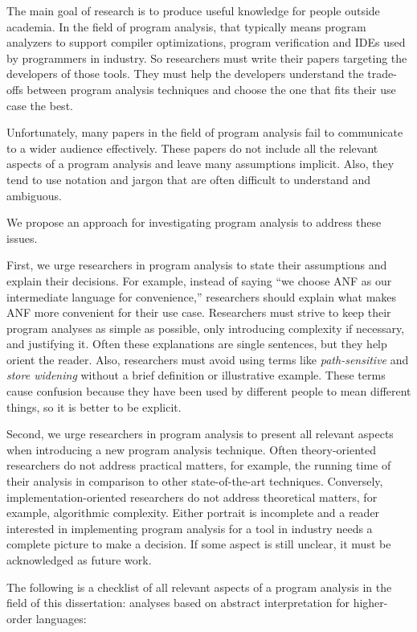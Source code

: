 \documentclass[12pt, oneside]{book}
\begin{document}
The main goal of research is to produce useful knowledge for people outside academia. In the field of program analysis, that typically means program analyzers to support compiler optimizations, program verification and IDEs used by programmers in industry. So researchers must write their papers targeting the developers of those tools. They must help the developers understand the trade-offs between program analysis techniques and choose the one that fits their use case the best.

Unfortunately, many papers in the field of program analysis fail to communicate to a wider audience effectively. These papers do not include all the relevant aspects of a program analysis and leave many assumptions implicit. Also, they tend to use notation and jargon that are often difficult to understand and ambiguous.

We propose an approach for investigating program analysis to address these issues.

First, we urge researchers in program analysis to state their assumptions and explain their decisions. For example, instead of saying “we choose ANF as our intermediate language for convenience,” researchers should explain what makes ANF more convenient for their use case. Researchers must strive to keep their program analyses as simple as possible, only introducing complexity if necessary, and justifying it. Often these explanations are single sentences, but they help orient the reader. Also, researchers must avoid using terms like \emph{path-sensitive} and \emph{store widening} without a brief definition or illustrative example. These terms cause confusion because they have been used by different people to mean different things, so it is better to be explicit.

Second, we urge researchers in program analysis to present all relevant aspects when introducing a new program analysis technique. Often theory-oriented researchers do not address practical matters, for example, the running time of their analysis in comparison to other state-of-the-art techniques. Conversely, implementation-oriented researchers do not address theoretical matters, for example, algorithmic complexity. Either portrait is incomplete and a reader interested in implementing program analysis for a tool in industry needs a complete picture to make a decision. If some aspect is still unclear, it must be acknowledged as future work.

The following is a checklist of all relevant aspects of a program analysis in the field of this dissertation: analyses based on abstract interpretation for higher-order languages:
\end{document}
